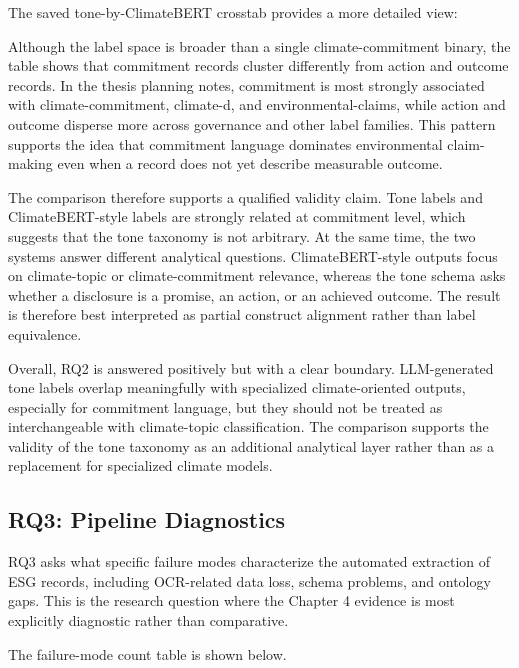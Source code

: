 The saved tone-by-ClimateBERT crosstab provides a more detailed view:

Although the label space is broader than a single climate-commitment binary, the table shows that commitment records cluster differently from action and outcome records. In the thesis planning notes, commitment is most strongly associated with climate-commitment, climate-d, and environmental-claims, while action and outcome disperse more across governance and other label families. This pattern supports the idea that commitment language dominates environmental claim-making even when a record does not yet describe measurable outcome.

The comparison therefore supports a qualified validity claim. Tone labels and ClimateBERT-style labels are strongly related at commitment level, which suggests that the tone taxonomy is not arbitrary. At the same time, the two systems answer different analytical questions. ClimateBERT-style outputs focus on climate-topic or climate-commitment relevance, whereas the tone schema asks whether a disclosure is a promise, an action, or an achieved outcome. The result is therefore best interpreted as partial construct alignment rather than label equivalence.

Overall, RQ2 is answered positively but with a clear boundary. LLM-generated tone labels overlap meaningfully with specialized climate-oriented outputs, especially for commitment language, but they should not be treated as interchangeable with climate-topic classification. The comparison supports the validity of the tone taxonomy as an additional analytical layer rather than as a replacement for specialized climate models.

\subsection{RQ3: Pipeline Diagnostics}

RQ3 asks what specific failure modes characterize the automated extraction of ESG records, including OCR-related data loss, schema problems, and ontology gaps. This is the research question where the Chapter 4 evidence is most explicitly diagnostic rather than comparative.

The failure-mode count table is shown below.

